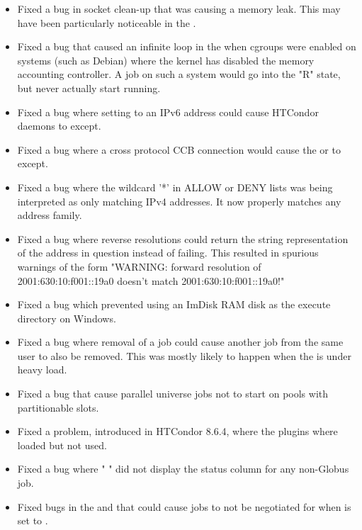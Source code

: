 \begin{itemize}

\item Fixed a bug in socket clean-up that was causing a memory leak.  This
may have been particularly noticeable in the .

\item Fixed a bug that caused an infinite loop in the  when
cgroups were enabled on systems (such as Debian) where the kernel has disabled
the memory accounting controller.  A job on such a system would go into the
"R" state, but never actually start running.

\item Fixed a bug where setting  to an
IPv6 address could cause HTCondor daemons to except.

\item Fixed a bug where a cross protocol CCB connection would cause the
 or  to except.

\item Fixed a bug where the wildcard '*' in ALLOW or DENY lists was
being interpreted as only matching IPv4 addresses.  It now properly
matches any address family.

\item Fixed a bug where reverse resolutions could return the string
representation of the address in question instead of failing.  This
resulted in spurious warnings of the form "WARNING: forward resolution of
2001:630:10:f001::19a0 doesn't match 2001:630:10:f001::19a0!"

\item Fixed a bug which prevented using an ImDisk RAM disk
as the execute directory on Windows.

\item Fixed a bug where removal of a job could cause another job from
the same user to also be removed.
This was mostly likely to happen when the  is under
heavy load.

\item Fixed a bug that cause parallel universe jobs not to start on
pools with partitionable slots.

\item Fixed a problem, introduced in HTCondor 8.6.4, where the
 plugins where loaded but not used.

\item Fixed a bug where " " did not display the
status column for any non-Globus job.

\item Fixed bugs in the  and  that
could cause jobs to not be negotiated for when
 is set to .

\end{itemize}


